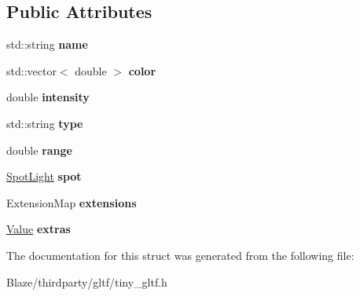 \subsection*{Public Attributes}
\begin{DoxyCompactItemize}
\item 
\mbox{\label{structtinygltf_1_1Light_a41ec515f6cda0a3a8577e52faf17bdfd}} 
std\+::string {\bfseries name}
\item 
\mbox{\label{structtinygltf_1_1Light_a24eb9ca5abaa89a1e9da969b677ff8cf}} 
std\+::vector$<$ double $>$ {\bfseries color}
\item 
\mbox{\label{structtinygltf_1_1Light_a16963b9fa148ae81a955b43c09c17217}} 
double {\bfseries intensity}
\item 
\mbox{\label{structtinygltf_1_1Light_afc81ec052920cf1d1c1ece4a2ad20e4c}} 
std\+::string {\bfseries type}
\item 
\mbox{\label{structtinygltf_1_1Light_a51dc4898bcbf6c5dd7be40163aa2d6f2}} 
double {\bfseries range}
\item 
\mbox{\label{structtinygltf_1_1Light_a96aac50db2e7a9380fc6d8db42272ee1}} 
\hyperlink{structtinygltf_1_1SpotLight}{Spot\+Light} {\bfseries spot}
\item 
\mbox{\label{structtinygltf_1_1Light_a279dd3318d054b8408517b5f4e2cf67f}} 
Extension\+Map {\bfseries extensions}
\item 
\mbox{\label{structtinygltf_1_1Light_a12dbc02e1e43917c1c99d5804e01e2cd}} 
\hyperlink{classtinygltf_1_1Value}{Value} {\bfseries extras}
\end{DoxyCompactItemize}


The documentation for this struct was generated from the following file\+:\begin{DoxyCompactItemize}
\item 
Blaze/thirdparty/gltf/tiny\+\_\+gltf.\+h\end{DoxyCompactItemize}

